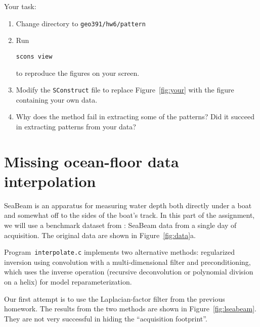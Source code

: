 
\lstset{language=python,numbers=left,numberstyle=\tiny,showstringspaces=false}


Your task:
\begin{enumerate}
\item Change directory to \verb#geo391/hw6/pattern#
\item Run 
\begin{verbatim}
scons view
\end{verbatim}
to reproduce the figures on your screen.
\item Modify the \texttt{SConstruct} file to replace Figure~\ref{fig:your} with the figure containing your own data.
\item Why does the method fail in extracting some of the patterns? Did it succeed in extracting patterns from your data?
\end{enumerate}

\section{Missing ocean-floor data interpolation}

SeaBeam is an apparatus for measuring water depth both directly under
a boat and somewhat off to the sides of the boat's track. In this part
of the assignment, we will use a benchmark dataset from \cite{gee}:
SeaBeam data from a single day of acquisition. The original data are
shown in Figure~\ref{fig:data}a.


Program~\texttt{interpolate.c} implements two alternative methods:
regularized inversion using convolution with a multi-dimensional
filter and preconditioning, which uses the inverse operation
(recursive deconvolution or polynomial division on a helix) for model
reparameterization.

Our first attempt is to use the Laplacian-factor filter from the
previous homework. The results from the two methods are shown in
Figure~\ref{fig:lseabeam}. They are not very successful in hiding
the ``acquisition footprint''.

